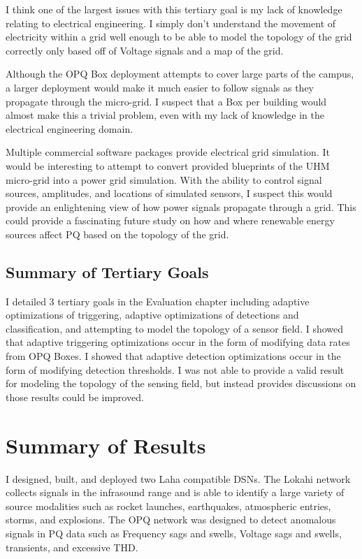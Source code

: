 I think one of the largest issues with this tertiary goal is my lack of knowledge relating to electrical engineering. I simply don't understand the movement of electricity within a grid well enough to be able to model the topology of the grid correctly only based off of Voltage signals and a map of the grid.

Although the OPQ Box deployment attempts to cover large parts of the campus, a larger deployment would make it much easier to follow signals as they propagate through the micro-grid. I suspect that a Box per building would almost make this a trivial problem, even with my lack of knowledge in the electrical engineering domain.

Multiple commercial software packages provide electrical grid simulation. It would be interesting to attempt to convert provided blueprints of the UHM micro-grid into a power grid simulation. With the ability to control signal sources, amplitudes, and locations of simulated sensors, I suspect this would provide an enlightening view of how power signals propagate through a grid. This could provide a fascinating future study on how and where renewable energy sources affect PQ based on the topology of the grid.

\subsection{Summary of Tertiary Goals}\label{subsec:summary-of-tertiary-goals}

I detailed 3 tertiary goals in the Evaluation chapter including adaptive optimizations of triggering, adaptive optimizations of detections and classification, and attempting to model the topology of a sensor field. I showed that adaptive triggering optimizations occur in the form of modifying data rates from OPQ Boxes. I showed that adaptive detection optimizations occur in the form of modifying detection thresholds. I was not able to provide a valid result for modeling the topology of the sensing field, but instead provides discussions on those results could be improved.

\section{Summary of Results}\label{sec:summary-of-results}

I designed, built, and deployed two Laha compatible DSNs. The Lokahi network collects signals in the infrasound range and is able to identify a large variety of source modalities such as rocket launches, earthquakes, atmospheric entries, storms, and explosions. The OPQ network was designed to detect anomalous signals in PQ data such as Frequency sags and swells, Voltage sags and swells, transients, and excessive THD.


